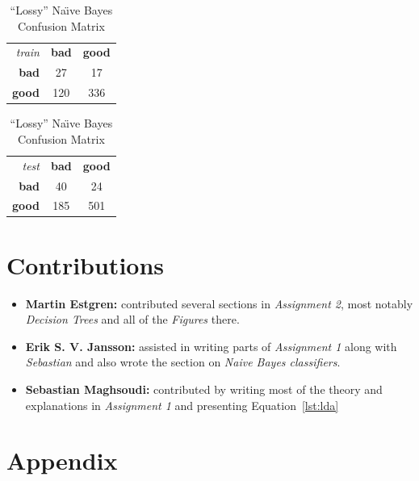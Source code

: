 \documentclass[a4paper, twocolumn]{article}
\begin{document}
        \begin{table}[h]
        \begin{center}
        \begin{tabular}{r|c|c|}
            \multicolumn{1}{r}{\emph{train}}
            &\multicolumn{1}{c}{\textbf{bad}}
            &\multicolumn{1}{c}{\textbf{good}} \\
            \cline{2-3}
            \textbf{bad} & 27 & 17 \\
            \cline{2-3}
            \textbf{good} & 120 & 336 \\
            \cline{2-3}
        \end{tabular}
        \begin{tabular}{r|c|c|}
            \multicolumn{1}{r}{\emph{test}}
            &\multicolumn{1}{c}{\textbf{bad}}
            &\multicolumn{1}{c}{\textbf{good}} \\
            \cline{2-3}
            \textbf{bad} & 40 & 24 \\
            \cline{2-3}
            \textbf{good} & 185 & 501 \\
            \cline{2-3}
        \end{tabular}
        \end{center}
        \caption{``Lossy'' Na{\"\i}ve Bayes Confusion Matrix}
        \label{table:bayes10}
        \end{table}

        \section*{Contributions}
            \begin{itemize}
                \item{\textbf{Martin Estgren:} contributed several sections in \emph{Assignment 2}, most notably \emph{Decision Trees} and all of the \emph{Figures} there.}
                \item{\textbf{Erik S. V. Jansson:} assisted in writing parts of \emph{Assignment 1} along with \emph{Sebastian} and also wrote the section on \emph{Naive Bayes classifiers}.}
                \item{\textbf{Sebastian Maghsoudi:} contributed by writing most of the theory and explanations in \emph{Assignment 1} and presenting Equation~\ref{lst:lda}}
            \end{itemize}

    \nocite{*} %
    
    
    \onecolumn \appendix
    \section*{Appendix}

    
    
\end{document}
